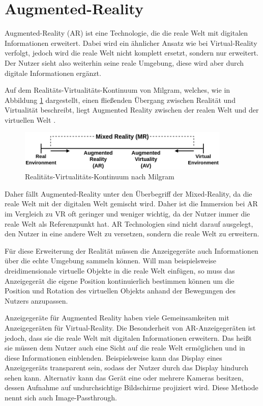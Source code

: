   \section{Augmented-Reality}
  Augmented-Reality (AR) ist eine Technologie, die die reale Welt mit digitalen Informationen erweitert.
  Dabei wird ein ähnlicher Ansatz wie bei Virtual-Reality verfolgt, jedoch wird die reale Welt nicht komplett ersetzt, sondern nur erweitert.
  Der Nutzer sieht also weiterhin seine reale Umgebung, diese wird aber durch digitale Informationen ergänzt.

  Auf dem Realitäts-Virtualitäts-Kontinuum von Milgram, welches, wie in Abbildung \ref{fig:rv-continuum} dargestellt, einen fließenden Übergang zwischen Realität und Virtualität beschreibt, liegt Augmented Reality zwischen der realen Welt und der virtuellen Welt \autocite[vgl.][S.9]{milgram1999}.

  \begin{figure}[H]
    \centering
    \includegraphics[width=0.9\textwidth]{images/RV-Continuum.png}
    \caption{Realitäts-Virtualitäts-Kontinuum nach Milgram}
    \label{fig:rv-continuum}
  \end{figure}

  Daher fällt Augmented-Reality unter den Überbegriff der Mixed-Reality, da die reale Welt mit der digitalen Welt gemischt wird.
  Daher ist die Immersion bei AR im Vergleich zu VR oft geringer und weniger wichtig, da der Nutzer immer die reale Welt als Referenzpunkt hat.
  AR Technologien sind nicht darauf ausgelegt, den Nutzer in eine andere Welt zu versetzen, sondern die reale Welt zu erweitern.

  Für diese Erweiterung der Realität müssen die Anzeigegeräte auch Informationen über die echte Umgebung sammeln können.
  Will man beispielsweise dreidimensionale virtuelle Objekte in die reale Welt einfügen, so muss das Anzeigegerät die eigene Position kontinuierlich bestimmen können um die Position und Rotation des virtuellen Objekts anhand der Bewegungen des Nutzers anzupassen.

  Anzeigegeräte für Augmented Reality haben viele Gemeinsamkeiten mit Anzeigegeräten für Virtual-Reality.
  Die Besonderheit von AR-Anzeigegeräten ist jedoch, dass sie die reale Welt mit digitalen Informationen erweitern.
  Das heißt sie müssen dem Nutzer auch eine Sicht auf die reale Welt ermöglichen und in diese Informationen einblenden.
  Beispielsweise kann das Display eines Anzeigegeräts transparent sein, sodass der Nutzer durch das Display hindurch sehen kann.
  Alternativ kann das Gerät eine oder mehrere Kameras besitzen, dessen Aufnahme auf undurchsichtige Bildschirme projiziert wird.
  Diese Methode nennt sich auch Image-Passthrough.

